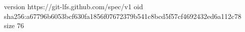 version https://git-lfs.github.com/spec/v1
oid sha256:a67796b6053bcf630fa1856f07672379b541c8bcd5f57cf4692432ed6a112c78
size 76
